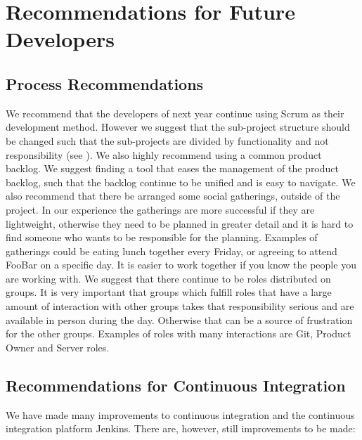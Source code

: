 \chapter{Recommendations for Future Developers}\label{chap:future_dev_recommendations}

\section{Process Recommendations}

We recommend that the developers of next year continue using Scrum as their development method. However we suggest that the sub-project structure should be changed such that the sub-projects are divided by functionality and not responsibility (see ). We also highly recommend using a common product backlog. We suggest finding a tool that eases the management of the product backlog, such that the backlog continue to be unified and is easy to navigate. 
We also recommend that there be arranged some social gatherings, outside of the project. In our experience the gatherings are more successful if they are lightweight, otherwise they need to be planned in greater detail and it is hard to find someone who wants to be responsible for the planning. Examples of gatherings could be eating lunch together every Friday, or agreeing to attend FooBar on a specific day. It is easier to work together if you know the people you are working with. 
We suggest that there continue to be roles distributed on groups. It is very important that groups which fulfill roles that have a large amount of interaction with other groups takes that responsibility serious and are available in person during the day. Otherwise that can be a source of frustration for the other groups. Examples of roles with many interactions are Git, Product Owner and Server roles.


\section{Recommendations for Continuous Integration}
We have made many improvements to continuous integration and the continuous integration platform Jenkins. There are, however, still improvements to be made: 

